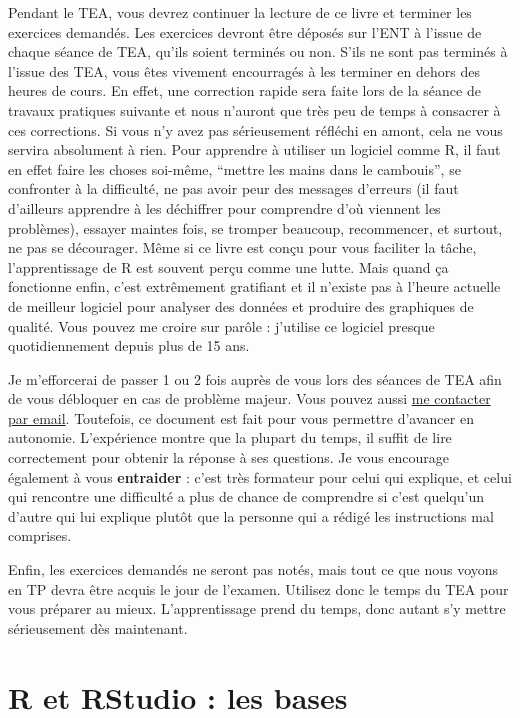 \documentclass[a4paperpaper,]{article}
\begin{document}
Pendant le TEA, vous devrez continuer la lecture de ce livre et terminer les exercices demandés. Les exercices devront être déposés sur l'ENT à l'issue de chaque séance de TEA, qu'ils soient terminés ou non. S'ils ne sont pas terminés à l'issue des TEA, vous êtes vivement encourragés à les terminer en dehors des heures de cours. En effet, une correction rapide sera faite lors de la séance de travaux pratiques suivante et nous n'auront que très peu de temps à consacrer à ces corrections. Si vous n'y avez pas sérieusement réfléchi en amont, cela ne vous servira absolument à rien. Pour apprendre à utiliser un logiciel comme R, il faut en effet faire les choses soi-même, ``mettre les mains dans le cambouis'', se confronter à la difficulté, ne pas avoir peur des messages d'erreurs (il faut d'ailleurs apprendre à les déchiffrer pour comprendre d'où viennent les problèmes), essayer maintes fois, se tromper beaucoup, recommencer, et surtout, ne pas se décourager. Même si ce livre est conçu pour vous faciliter la tâche, l'apprentissage de R est souvent perçu comme une lutte. Mais quand ça fonctionne enfin, c'est extrêmement gratifiant et il n'existe pas à l'heure actuelle de meilleur logiciel pour analyser des données et produire des graphiques de qualité. Vous pouvez me croire sur parôle : j'utilise ce logiciel presque quotidiennement depuis plus de 15 ans.

Je m'efforcerai de passer 1 ou 2 fois auprès de vous lors des séances de TEA afin de vous débloquer en cas de problème majeur. Vous pouvez aussi \href{mailto:bsimonbo@univ-lr.fr}{me contacter par email}. Toutefois, ce document est fait pour vous permettre d'avancer en autonomie. L'expérience montre que la plupart du temps, il suffit de lire correctement pour obtenir la réponse à ses questions. Je vous encourage également à vous \textbf{entraider} : c'est très formateur pour celui qui explique, et celui qui rencontre une difficulté a plus de chance de comprendre si c'est quelqu'un d'autre qui lui explique plutôt que la personne qui a rédigé les instructions mal comprises.

Enfin, les exercices demandés ne seront pas notés, mais tout ce que nous voyons en TP devra être acquis le jour de l'examen. Utilisez donc le temps du TEA pour vous préparer au mieux. L'apprentissage prend du temps, donc autant s'y mettre sérieusement dès maintenant.

\hypertarget{bases}{%
\section{R et RStudio : les bases}\label{bases}}
\end{document}
